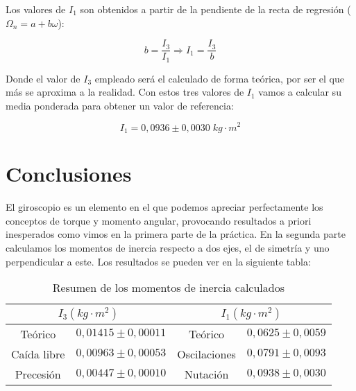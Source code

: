 \documentclass[a4paper,12pt,titlepage]{article}
\begin{document}
\newpage

Los valores de $I_1$ son obtenidos a partir de la pendiente de la recta de regresión ($\Omega_n=a+b\omega$):

\begin{equation}
    b = \frac{I_3}{I_1} \Rightarrow I_1 = \frac{I_3}{b}
\end{equation}

Donde el valor de $I_3$ empleado será el calculado de forma teórica, por ser el que más se aproxima a la realidad. Con estos tres valores de $I_1$ vamos a calcular su media ponderada para obtener un valor de referencia:

\begin{equation}
    I_1 = 0,0936 \pm 0,0030 \;kg\cdot m^2
\end{equation}

\section{Conclusiones}

El giroscopio es un elemento en el que podemos apreciar perfectamente los conceptos de torque y momento angular, provocando resultados a priori inesperados como vimos en la primera parte de la práctica. En la segunda parte calculamos los momentos de inercia respecto a dos ejes, el de simetría y uno perpendicular a este. Los resultados se pueden ver en la siguiente tabla:

\begin{table}[h!]
    \centering
    \begin{tabular}{|cc|cc|}
    \hline
    \multicolumn{2}{|c|}{$I_3(kg\cdot m^2)$}                  & \multicolumn{2}{c|}{$I_1(kg\cdot m^2)$}                 \\ \hline
    \multicolumn{1}{|c|}{Teórico}     & $0,01415 \pm 0,00011$ & \multicolumn{1}{c|}{Teórico}      & $0,0625 \pm 0,0059$ \\ \hline
    \multicolumn{1}{|c|}{Caída libre} & $0,00963 \pm 0,00053$ & \multicolumn{1}{c|}{Oscilaciones} & $0,0791 \pm 0,0093$ \\ \hline
    \multicolumn{1}{|c|}{Precesión}   & $0,00447 \pm 0,00010$ & \multicolumn{1}{c|}{Nutación}     & $0,0938 \pm 0,0030$ \\ \hline
    \end{tabular}
    \caption{Resumen de los momentos de inercia calculados}
    \label{tab:my-table}
    \end{table}
\end{document}
